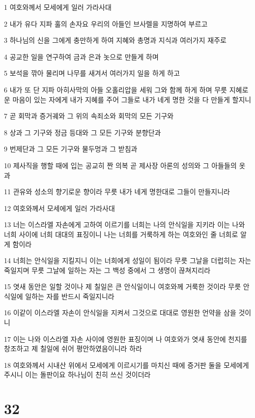 \par 1 여호와께서 모세에게 일러 가라사대
\par 2 내가 유다 지파 훌의 손자요 우리의 아들인 브사렐을 지명하여 부르고
\par 3 하나님의 신을 그에게 충만하게 하여 지혜와 총명과 지식과 여러가지 재주로
\par 4 공교한 일을 연구하여 금과 은과 놋으로 만들게 하며
\par 5 보석을 깎아 물리며 나무를 새겨서 여러가지 일을 하게 하고
\par 6 내가 또 단 지파 아히사막의 아들 오홀리압을 세워 그와 함께 하게 하며 무릇 지혜로운 마음이 있는 자에게 내가 지혜를 주어 그들로 내가 네게 명한 것을 다 만들게 할지니
\par 7 곧 회막과 증거궤와 그 위의 속죄소와 회막의 모든 기구와
\par 8 상과 그 기구와 정금 등대와 그 모든 기구와 분향단과
\par 9 번제단과 그 모든 기구와 물두멍과 그 받침과
\par 10 제사직을 행할 때에 입는 공교히 짠 의복 곧 제사장 아론의 성의와 그 아들들의 옷과
\par 11 관유와 성소의 향기로운 향이라 무릇 내가 네게 명한대로 그들이 만들지니라
\par 12 여호와께서 모세에게 일러 가라사대
\par 13 너는 이스라엘 자손에게 고하여 이르기를 너희는 나의 안식일을 지키라 이는 나와 너희 사이에 너희 대대의 표징이니 나는 너희를 거룩하게 하는 여호와인 줄 너희로 알게 함이라
\par 14 너희는 안식일을 지킬지니 이는 너희에게 성일이 됨이라 무릇 그날을 더럽히는 자는 죽일지며 무릇 그날에 일하는 자는 그 백성 중에서 그 생명이 끊쳐지리라
\par 15 엿새 동안은 일할 것이나 제 칠일은 큰 안식일이니 여호와께 거룩한 것이라 무릇 안식일에 일하는 자를 반드시 죽일지니라
\par 16 이같이 이스라엘 자손이 안식일을 지켜서 그것으로 대대로 영원한 언약을 삼을 것이니
\par 17 이는 나와 이스라엘 자손 사이에 영원한 표징이며 나 여호와가 엿새 동안에 천지를 창조하고 제 칠일에 쉬어 평안하였음이니라 하라
\par 18 여호와께서 시내산 위에서 모세에게 이르시기를 마치신 때에 증거판 둘을 모세에게 주시니 이는 돌판이요 하나님이 친히 쓰신 것이더라

\chapter{32}

